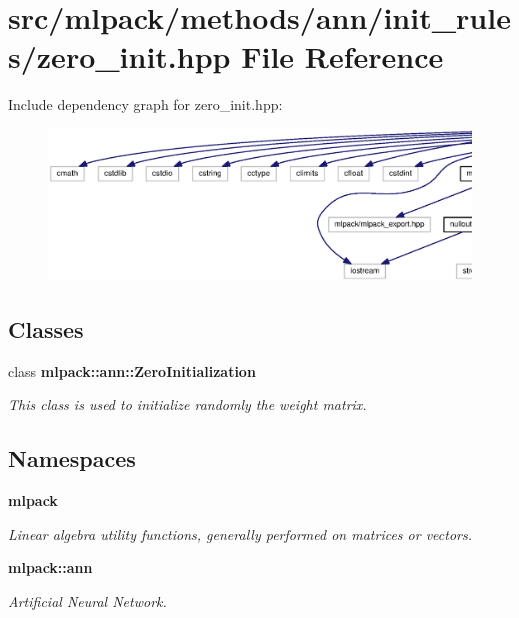 \section{src/mlpack/methods/ann/init\+\_\+rules/zero\+\_\+init.hpp File Reference}
\label{ann_2init__rules_2zero__init_8hpp}
Include dependency graph for zero\+\_\+init.\+hpp\+:
\nopagebreak
\begin{figure}[H]
\begin{center}
\leavevmode
\includegraphics[width=350pt]{ann_2init__rules_2zero__init_8hpp__incl}
\end{center}
\end{figure}
\subsection*{Classes}
\begin{DoxyCompactItemize}
\item 
class {\bf mlpack\+::ann\+::\+Zero\+Initialization}
\begin{DoxyCompactList}\small\item\em This class is used to initialize randomly the weight matrix. \end{DoxyCompactList}\end{DoxyCompactItemize}
\subsection*{Namespaces}
\begin{DoxyCompactItemize}
\item 
 {\bf mlpack}
\begin{DoxyCompactList}\small\item\em Linear algebra utility functions, generally performed on matrices or vectors. \end{DoxyCompactList}\item 
 {\bf mlpack\+::ann}
\begin{DoxyCompactList}\small\item\em Artificial Neural Network. \end{DoxyCompactList}\end{DoxyCompactItemize}
